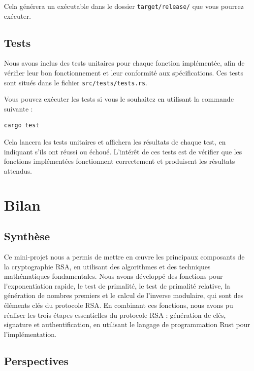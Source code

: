 \documentclass[11pt]{article}
\begin{document}
Cela générera un exécutable dans le dossier \texttt{target/release/} que vous pourrez exécuter.

\subsection{Tests}\label{subsec:tests}

Nous avons inclus des tests unitaires pour chaque fonction implémentée, afin de vérifier leur bon fonctionnement et leur conformité aux spécifications.
Ces tests sont situés dans le fichier \texttt{src/tests/tests.rs}.

Vous pouvez exécuter les tests si vous le souhaitez en utilisant la commande suivante :

\lstset{language=bash}
\begin{lstlisting}[caption={Exécution des tests unitaires avec Cargo}, label={lst:cargo_test}]
cargo test
\end{lstlisting}

Cela lancera les tests unitaires et affichera les résultats de chaque test, en indiquant s'ils ont réussi ou échoué.
L'intérêt de ces tests est de vérifier que les fonctions implémentées fonctionnent correctement et produisent les résultats attendus.


\section{Bilan}\label{sec:bilan}

\subsection{Synthèse}\label{subsec:synthese}

Ce mini-projet nous a permis de mettre en œuvre les principaux composants de la cryptographie RSA, en utilisant des algorithmes et des techniques mathématiques fondamentales.
Nous avons développé des fonctions pour l'exponentiation rapide, le test de primalité, le test de primalité relative, la génération de nombres premiers et le calcul de l'inverse modulaire, qui sont des éléments clés du protocole RSA\@.
En combinant ces fonctions, nous avons pu réaliser les trois étapes essentielles du protocole RSA : génération de clés, signature et authentification, en utilisant le langage de programmation Rust pour l'implémentation.

\subsection{Perspectives}\label{subsec:perspectives}
\end{document}
